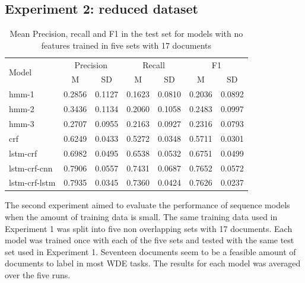 \documentclass[sigconf]{acmart}
\begin{document}
\subsection{Experiment 2: reduced dataset}

\begin{table}[h]
  \small
  \begin{center}
    \begin{tabular}{ lllllll }
      \toprule
      \multirow{2}{*}{Model} & \multicolumn{2}{c}{Precision} & \multicolumn{2}{c}{Recall} & \multicolumn{2}{c}{F1} \\
                             & \multicolumn{1}{c}{\tiny{M}} & \multicolumn{1}{c}{\tiny{SD}}
			     & \multicolumn{1}{c}{\tiny{M}} & \multicolumn{1}{c}{\tiny{SD}}
			     & \multicolumn{1}{c}{\tiny{M}} & \multicolumn{1}{c}{\tiny{SD}} \\
      \midrule
      hmm-1	      & 0.2856 & 0.1127 & 0.1623 & 0.0810 & 0.2036 & 0.0892 \\
      hmm-2	      & 0.3436 & 0.1134 & 0.2060 & 0.1058 & 0.2483 & 0.0997 \\
      hmm-3	      & 0.2707 & 0.0955 & 0.2163 & 0.0927 & 0.2316 & 0.0793 \\
      crf	      & 0.6249 & 0.0433 & 0.5272 & 0.0348 & 0.5711 & 0.0301 \\
      lstm-crf	      & 0.6982 & 0.0495 & 0.6538 & 0.0532 & 0.6751 & 0.0499 \\
      lstm-crf-cnn    & 0.7906 & 0.0557 & 0.7431 & 0.0687 & 0.7652 & 0.0572 \\
      lstm-crf-lstm   & 0.7935 & 0.0345 & 0.7360 & 0.0424 & 0.7626 & 0.0237 \\
      \bottomrule
    \end{tabular}
  \end{center}
  \caption{Mean Precision, recall and F1 in the test set for models with no features
   trained in five sets with 17 documents}
  \label{tab:experiment2}
\end{table}

The second experiment aimed to evaluate the performance of sequence models when 
the amount of training data is small. The same training data used in Experiment 1 was
split into five non overlapping sets with 17 documents. Each model was trained once 
with each of the five sets and tested with the same test set used in Experiment 1. 
Seventeen documents seem to be a feasible amount of documents to label in most WDE 
tasks. The results for each model was averaged over the five runs.
\end{document}
